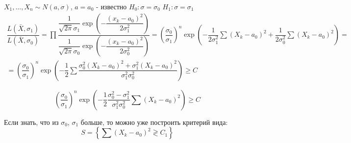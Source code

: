 



  

\begin{ex}
  $X_1,\dots,X_n \sim N(a, \sigma)$, $a = a_0$ - известно
  $H_0 : \sigma = \sigma_0$
  $H_1 : \sigma = \sigma_1$
  \begin{multline*}
    \dfrac{L(\bar X, \sigma_1)}{L(\bar X, \sigma_0)}
    = \prod \dfrac{\dfrac{1}{\sqrt{2\pi} \sigma_1} \exp\left(- \dfrac{(x_k -
    a_0)^2}{2\sigma_1^2}\right)}{\dfrac{1}{\sqrt{2\pi} \sigma_0} \exp\left(- \dfrac{(x_k - a_0)^2}{2\sigma_0^2}\right)}
    = \left(\dfrac{\sigma_0}{\sigma_1}\right)^n \exp\left(-\dfrac{1}{2\sigma_1^2} \sum (X_k-a_0)^2 + \dfrac{1}{2\sigma_0^2} \sum (X_k-a_0)^2 \right) = \\
    = \left(\dfrac{\sigma_0}{\sigma_1}\right)^n \exp\left( -\dfrac{1}{2} \sum \dfrac{\sigma_0^2 (X_k-a_0)^2 + \sigma_1^2 (X_k - a_0)^2}{\sigma_1^2 \sigma_0^2} \right) \geqslant C
  \end{multline*}

  \begin{equation*}
    \left(\dfrac{\sigma_0}{\sigma_1}\right)^n \exp\left(-\dfrac{1}{2} \dfrac{\sigma_0^2 - \sigma_1^2}{\sigma_1^2 \sigma_0^2} \sum (X_k-a_0)^2\right) \geqslant C
  \end{equation*}

  Если знать, что из $ \sigma_0 $, $ \sigma_1 $ больше, то можно уже построить критерий вида:
  $$ S = \left\{ \sum(X_k-a_0)^2 \gtrless C_1 \right\} $$
\end{ex}

